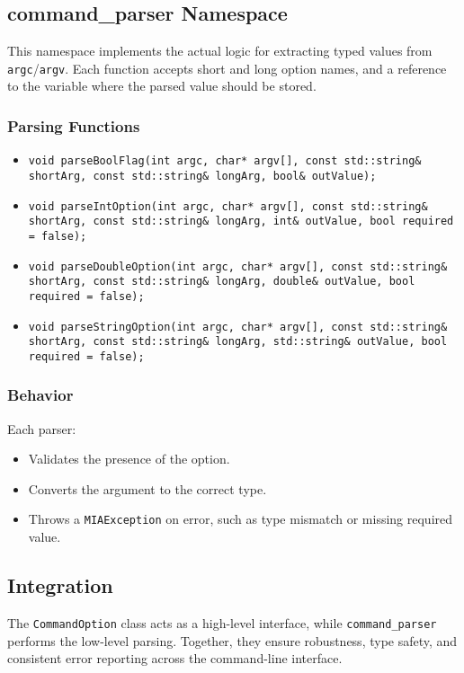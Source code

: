 \subsection{command\_parser Namespace}

This namespace implements the actual logic for extracting typed values from \texttt{argc}/\texttt{argv}. Each function accepts short and long option names, and a reference to the variable where the parsed value should be stored.

\subsubsection*{Parsing Functions}
\begin{itemize}
	\item \texttt{void parseBoolFlag(int argc, char* argv[], const std::string\& shortArg, const std::string\& longArg, bool\& outValue);}
	\item \texttt{void parseIntOption(int argc, char* argv[], const std::string\& shortArg, const std::string\& longArg, int\& outValue, bool required = false);}
	\item \texttt{void parseDoubleOption(int argc, char* argv[], const std::string\& shortArg, const std::string\& longArg, double\& outValue, bool required = false);}
	\item \texttt{void parseStringOption(int argc, char* argv[], const std::string\& shortArg, const std::string\& longArg, std::string\& outValue, bool required = false);}
\end{itemize}

\subsubsection*{Behavior}
Each parser:
\begin{itemize}
	\item Validates the presence of the option.
	\item Converts the argument to the correct type.
	\item Throws a \texttt{MIAException} on error, such as type mismatch or missing required value.
\end{itemize}

\subsection{Integration}

The \texttt{CommandOption} class acts as a high-level interface, while \texttt{command\_parser} performs the low-level parsing. Together, they ensure robustness, type safety, and consistent error reporting across the command-line interface.















